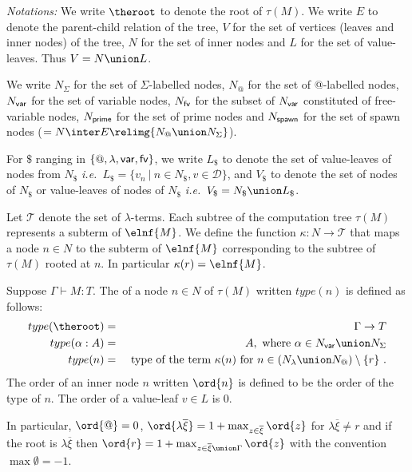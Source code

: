 \emph{Notations:} We write $\theroot$ to denote the root of
$\tau(M)$. We write $E$ to denote the parent-child relation of the
tree, $V$ for the set of vertices (leaves and inner nodes) of the
tree, $N$ for the set of inner nodes and $L$ for the set of
value-leaves. Thus $V = N \union L$.

We write $N_\Sigma$ for the set of $\Sigma$-labelled nodes, $N_@$ for the set
of @-labelled nodes, $N_{\sf var}$ for the set of variable nodes,
$N_{\sf fv}$ for the subset of $N_{\sf var}$ constituted of free-variable nodes, $N_{\sf prime}$ for the set of prime nodes
and $N_{\sf spawn}$ for the set of spawn nodes ($= N \inter E \relimg{N_@ \union N_\Sigma}$).

For $\$$ ranging in $\{@, \lambda, {\sf var}, {\sf fv} \}$,
we write $L_\$$ to denote the set of value-leaves of nodes from $N_\$$
{\it i.e.}\ $L_\$ = \{ v_n \ | \ n \in N_\$, v \in \mathcal{D} \}$,
and $V_\$$ to denote the set of nodes of $N_\$$ or value-leaves of nodes of $N_\$$
{\it i.e.}\ $V_\$ = N_\$ \union L_\$ $.


Let $\mathcal{T}$ denote the set of $\lambda$-terms.
Each subtree of the computation tree $\tau(M)$ represents a subterm of $\elnf{M}$.
We define the function $\kappa : N \rightarrow \mathcal{T}$ that maps a node $n \in N$ to the subterm of $\elnf{M}$
corresponding to the subtree of $\tau(M)$ rooted at $n$.
In particular $\kappa(r) = \elnf{M}$.

\begin{definition}
\label{def:nodeorder}
Suppose $\Gamma \vdash M : T$.
The  of a node $n \in N$ of $\tau(M)$ written $type(n)$ is defined as follows:
\begin{eqnarray*}
type(\theroot) &=& \Gamma \rightarrow T \\
type(\alpha:A) &=& A, \mbox{ where $\alpha \in N_{\sf var} \union N_\Sigma$} \\
type(n) &=& \hbox{ type of the term $\kappa(n)$ for $n \in (N_\lambda \union N_@) \setminus \{r \}$\ .}
\end{eqnarray*}
The order of an inner node $n$ written $\ord{n}$ is defined to be
the order of the type of $n$. The order of a value-leaf $v \in L$ is
$0$.
\end{definition}

In particular, $\ord{@} = 0$, $\ord{\lambda \overline{\xi}} = 1+
\max_{z\in \overline{\xi}} \ord{z}$ for $\lambda \overline{\xi}\neq
r$ and if the root is $\lambda \overline{\xi}$ then $\ord{r} = 1 + \max_{z\in
\overline{\xi}\union \Gamma} \ord{z}$ with the convention $\max
\emptyset = -1$.

